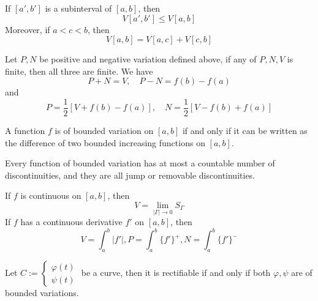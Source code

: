 \documentclass[openany]{book}
\begin{document}
\begin{prop}
    If $[a',b']$ is a subinterval of $[a,b]$, then 
    \begin{equation*}
        V[a',b']\leq V[a,b]
    \end{equation*}
    Moreover, if $a<c<b$, then 
    \begin{equation*}
        V[a,b]=V[a,c]+V[c,b]
    \end{equation*}
\end{prop}
\begin{prop}
    Let $P,N$ be positive and negative variation defined above, if any of $P,N,V$ is finite, then all three are finite. We have 
    \begin{equation*}
        P+N=V, \quad P-N=f(b)-f(a)
    \end{equation*}
    and 
    \begin{equation*}
        P=\frac{1}{2}[V+f(b)-f(a)], \quad N=\frac{1}{2}[V-f(b)+f(a)]
    \end{equation*}
\end{prop}
\begin{prop}
    A function $f$ is of bounded variation on $[a,b]$ if and only if it can be written as the difference of two bounded increasing functions on $[a,b]$.
\end{prop}
\begin{prop}
    Every function of bounded variation has at most a countable number of discontinuities, and they are all jump or removable discontinuities.
\end{prop}
\begin{prop}
    If $f$ is continuous on $[a,b]$, then 
    \begin{equation*}
        V=\lim_{|\Gamma|\to 0}S_\Gamma
    \end{equation*}
    If $f$ has a continuous derivative $f'$ on $[a,b]$, then 
    \begin{equation*}
        V=\int_a^b|f'|, P=\int_a^b\{f'\}^+, N=\int_a^b\{f'\}^-
    \end{equation*}
\end{prop}
\begin{prop}
    Let $C:=\begin{cases}
        \varphi(t)\\
        \psi(t)
    \end{cases}$ be a curve, then it is rectifiable if and only if both $\varphi,\psi$ are of bounded variations.
\end{prop}
\end{document}
